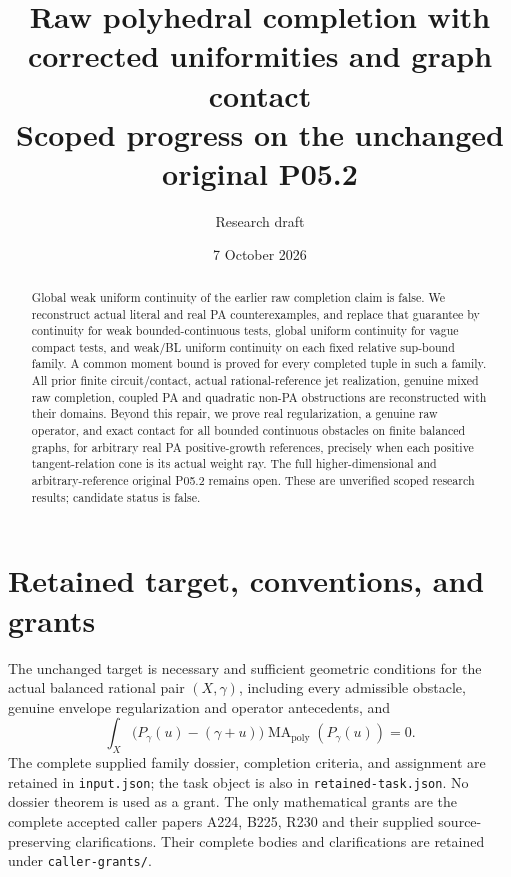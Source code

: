 \documentclass[11pt]{article}
\title{Raw polyhedral completion with corrected uniformities and graph contact\\
\large Scoped progress on the unchanged original P05.2}
\author{Research draft}
\date{7 October 2026}
\newcommand{\MA}{\operatorname{MA}_{\mathrm{poly}}}
\begin{document}
\maketitle
\begin{abstract}
Global weak uniform continuity of the earlier raw completion claim is false.
We reconstruct actual literal and real PA counterexamples, and replace that
guarantee by continuity for weak bounded-continuous tests, global uniform
continuity for vague compact tests, and weak/BL uniform continuity on each
fixed relative sup-bound family. A common moment bound is proved for every
completed tuple in such a family. All prior finite circuit/contact, actual
rational-reference jet realization, genuine mixed raw completion, coupled
PA and quadratic non-PA obstructions are reconstructed with their domains.
Beyond this repair, we prove real regularization, a genuine raw operator,
and exact contact for all bounded continuous obstacles on finite balanced
graphs, for arbitrary real PA positive-growth references, precisely when
each positive tangent-relation cone is its actual weight ray. The full
higher-dimensional and arbitrary-reference original P05.2 remains open.
These are unverified scoped research results; candidate status is false.
\end{abstract}

\section{Retained target, conventions, and grants}
The unchanged target is necessary and sufficient geometric conditions for
the actual balanced rational pair \((X,\gamma)\), including every admissible
obstacle, genuine envelope regularization and operator antecedents, and
\[
 \int_X\bigl(P_\gamma(u)-(\gamma+u)\bigr)\MA(P_\gamma(u))=0.
\]
The complete supplied family dossier, completion criteria, and assignment
are retained in \texttt{input.json}; the task object is also in \texttt{retained-task.json}. No
dossier theorem is used as a grant. The only mathematical grants are the
complete accepted caller papers A224, B225, R230 and their supplied
source-preserving clarifications. Their complete bodies and clarifications
are retained under \texttt{caller-grants/}.
\end{document}
